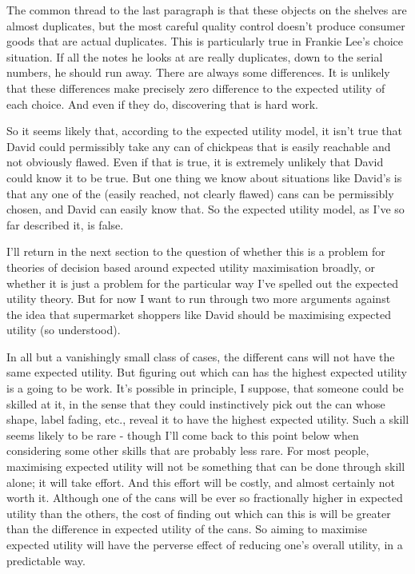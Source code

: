 \documentclass[11pt,]{book}
\begin{document}
The common thread to the last paragraph is that these objects on the shelves are almost duplicates, but the most careful quality control doesn't produce consumer goods that are actual duplicates. This is particularly true in Frankie Lee's choice situation. If all the notes he looks at are really duplicates, down to the serial numbers, he should run away. There are always some differences. It is unlikely that these differences make precisely zero difference to the expected utility of each choice. And even if they do, discovering that is hard work.

So it seems likely that, according to the expected utility model, it isn't true that David could permissibly take any can of chickpeas that is easily reachable and not obviously flawed. Even if that is true, it is extremely unlikely that David could know it to be true. But one thing we know about situations like David's is that any one of the (easily reached, not clearly flawed) cans can be permissibly chosen, and David can easily know that. So the expected utility model, as I've so far described it, is false.

I'll return in the next section to the question of whether this is a problem for theories of decision based around expected utility maximisation broadly, or whether it is just a problem for the particular way I've spelled out the expected utility theory. But for now I want to run through two more arguments against the idea that supermarket shoppers like David should be maximising expected utility (so understood).

In all but a vanishingly small class of cases, the different cans will not have the same expected utility. But figuring out which can has the highest expected utility is a going to be work. It's possible in principle, I suppose, that someone could be skilled at it, in the sense that they could instinctively pick out the can whose shape, label fading, etc., reveal it to have the highest expected utility. Such a skill seems likely to be rare - though I'll come back to this point below when considering some other skills that are probably less rare. For most people, maximising expected utility will not be something that can be done through skill alone; it will take effort. And this effort will be costly, and almost certainly not worth it. Although one of the cans will be ever so fractionally higher in expected utility than the others, the cost of finding out which can this is will be greater than the difference in expected utility of the cans. So aiming to maximise expected utility will have the perverse effect of reducing one's overall utility, in a predictable way.
\end{document}
